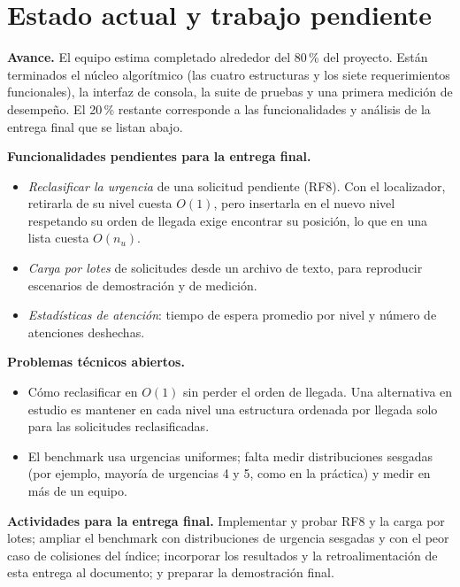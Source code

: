 \section{Estado actual y trabajo pendiente}
\label{sec:estado}

\textbf{Avance.} El equipo estima completado alrededor del 80\,\% del
proyecto. Están terminados el núcleo algorítmico (las cuatro estructuras y
los siete requerimientos funcionales), la interfaz de consola, la suite de
pruebas y una primera medición de desempeño. El 20\,\% restante corresponde
a las funcionalidades y análisis de la entrega final que se listan abajo.

\textbf{Funcionalidades pendientes para la entrega final.}
\begin{itemize}
  \item \emph{Reclasificar la urgencia} de una solicitud pendiente
    (RF8). Con el localizador, retirarla de su nivel cuesta $O(1)$, pero
    insertarla en el nuevo nivel respetando su orden de llegada exige
    encontrar su posición, lo que en una lista cuesta $O(n_u)$.
  \item \emph{Carga por lotes} de solicitudes desde un archivo de texto,
    para reproducir escenarios de demostración y de medición.
  \item \emph{Estadísticas de atención}: tiempo de espera promedio por nivel
    y número de atenciones deshechas.
\end{itemize}

\textbf{Problemas técnicos abiertos.}
\begin{itemize}
  \item Cómo reclasificar en $O(1)$ sin perder el orden de llegada. Una
    alternativa en estudio es mantener en cada nivel una estructura
    ordenada por llegada solo para las solicitudes reclasificadas.
  \item El benchmark usa urgencias uniformes; falta medir distribuciones
    sesgadas (por ejemplo, mayoría de urgencias 4 y 5, como en la práctica)
    y medir en más de un equipo.
\end{itemize}

\textbf{Actividades para la entrega final.} Implementar y probar RF8 y la
carga por lotes; ampliar el benchmark con distribuciones de urgencia
sesgadas y con el peor caso de colisiones del índice; incorporar los
resultados y la retroalimentación de esta entrega al documento; y preparar
la demostración final.
